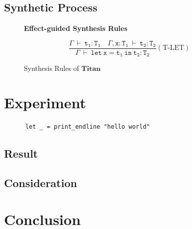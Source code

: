 \documentclass[12pt, a4paper, titlepage]{report}
\begin{document}
  \section{Synthetic Process}\label{section:syntheticProcess}
    \begin{figure}[htbp]
      \centering
      \begin{flushleft}
        \textbf{Effect-guided Synthesis Rules} \quad {}
      \end{flushleft}
      \[
        \dfrac
          {\mathtt{\Gamma\ \vdash\ t_1 : T_1 \quad \Gamma, x : T_1\ \vdash\ t_2 : T_2}}
          {\mathtt{\Gamma\ \vdash\ let\ x=t_1\ in\ t_2 : T_2}}
          \left(\textrm{T-LET}\right)
      \]
      \caption{Synthesis Rules of $\mathbf{Titan}$}
      \label{fig:synthesisRules}
    \end{figure}

\chapter{Experiment}\label{chapter:experiment}
    \begin{verbatim}
      let _ = print_endline "hello world"
    \end{verbatim}
  \section{Result}
  \section{Consideration}

\chapter{Conclusion}\label{chapter:conclusion}



\end{document}
